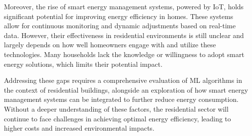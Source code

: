 \documentclass[a4paper, 12pt]{article}
\begin{document}
\quad Moreover, the rise of smart energy management systems, powered by IoT, holds significant potential for improving energy efficiency in homes. These systems allow for continuous monitoring and dynamic adjustments based on real-time data. However, their effectiveness in residential environments is still unclear and largely depends on how well homeowners engage with and utilize these technologies. Many households lack the knowledge or willingness to adopt smart energy solutions, which limits their potential impact.
\vspace{7pt}

\quad Addressing these gaps requires a comprehensive evaluation of ML algorithms in the context of residential buildings, alongside an exploration of how smart energy management systems can be integrated to further reduce energy consumption. Without a deeper understanding of these factors, the residential sector will continue to face challenges in achieving optimal energy efficiency, leading to higher costs and increased environmental impacts.
\end{document}
